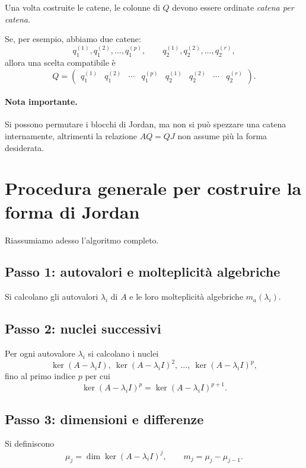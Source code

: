 Una volta costruite le catene, le colonne di $Q$ devono essere ordinate \emph{catena per catena}.

Se, per esempio, abbiamo due catene:
\[
q_1^{(1)},q_1^{(2)},\dots,q_1^{(p)},
\qquad
q_2^{(1)},q_2^{(2)},\dots,q_2^{(r)},
\]
allora una scelta compatibile è
\begin{equation}
Q=
\begin{pmatrix}
q_1^{(1)} & q_1^{(2)} & \cdots & q_1^{(p)} &
q_2^{(1)} & q_2^{(2)} & \cdots & q_2^{(r)}
\end{pmatrix}.
\label{eq:L7_Q_ordered_by_chains}
\end{equation}

\paragraph{Nota importante.}
Si possono permutare i blocchi di Jordan, ma non si può spezzare una catena internamente, altrimenti la relazione $AQ=QJ$ non assume più la forma desiderata.

\section{Procedura generale per costruire la forma di Jordan}

Riassumiamo adesso l'algoritmo completo.

\subsection*{Passo 1: autovalori e molteplicità algebriche}

Si calcolano gli autovalori $\lambda_i$ di $A$ e le loro molteplicità algebriche $m_a(\lambda_i)$.

\subsection*{Passo 2: nuclei successivi}

Per ogni autovalore $\lambda_i$ si calcolano i nuclei
\[
\ker(A-\lambda_i I),\ \ker(A-\lambda_i I)^2,\ \dots,\ \ker(A-\lambda_i I)^p,
\]
fino al primo indice $p$ per cui
\[
\ker(A-\lambda_i I)^p=\ker(A-\lambda_i I)^{p+1}.
\]

\subsection*{Passo 3: dimensioni e differenze}

Si definiscono
\[
\mu_j=\dim\ker(A-\lambda_i I)^j,
\qquad
m_j=\mu_j-\mu_{j-1}.
\]

